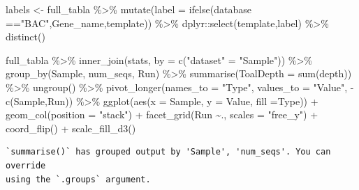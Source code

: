 \documentclass[
  letterpaper,
  DIV=11,
  numbers=noendperiod]{scrartcl}
\newenvironment{Shaded}{\begin{snugshade}}{\end{snugshade}}
\newcommand{\AttributeTok}[1]{\textcolor[rgb]{0.40,0.45,0.13}{#1}}
\newcommand{\FunctionTok}[1]{\textcolor[rgb]{0.28,0.35,0.67}{#1}}
\newcommand{\NormalTok}[1]{\textcolor[rgb]{0.00,0.23,0.31}{#1}}
\newcommand{\OtherTok}[1]{\textcolor[rgb]{0.00,0.23,0.31}{#1}}
\newcommand{\SpecialCharTok}[1]{\textcolor[rgb]{0.37,0.37,0.37}{#1}}
\newcommand{\StringTok}[1]{\textcolor[rgb]{0.13,0.47,0.30}{#1}}
\begin{document}
\begin{Shaded}
\begin{Highlighting}[]
\NormalTok{labels }\OtherTok{\textless{}{-}}\NormalTok{ full\_tabla }\SpecialCharTok{\%\textgreater{}\%} \FunctionTok{mutate}\NormalTok{(}\AttributeTok{label =} \FunctionTok{ifelse}\NormalTok{(database }\SpecialCharTok{==}\StringTok{"BAC"}\NormalTok{,Gene\_name,template)) }\SpecialCharTok{\%\textgreater{}\%}\NormalTok{ dplyr}\SpecialCharTok{::}\FunctionTok{select}\NormalTok{(template,label) }\SpecialCharTok{\%\textgreater{}\%} \FunctionTok{distinct}\NormalTok{()}



\NormalTok{full\_tabla }\SpecialCharTok{\%\textgreater{}\%} \FunctionTok{inner\_join}\NormalTok{(stats, }\AttributeTok{by =} \FunctionTok{c}\NormalTok{(}\StringTok{"dataset"} \OtherTok{=} \StringTok{"Sample"}\NormalTok{)) }\SpecialCharTok{\%\textgreater{}\%} 
  \FunctionTok{group\_by}\NormalTok{(Sample, num\_seqs, Run) }\SpecialCharTok{\%\textgreater{}\%} 
  \FunctionTok{summarise}\NormalTok{(}\AttributeTok{ToalDepth =} \FunctionTok{sum}\NormalTok{(depth)) }\SpecialCharTok{\%\textgreater{}\%} 
  \FunctionTok{ungroup}\NormalTok{() }\SpecialCharTok{\%\textgreater{}\%} 
  \FunctionTok{pivot\_longer}\NormalTok{(}\AttributeTok{names\_to =} \StringTok{"Type"}\NormalTok{, }\AttributeTok{values\_to =} \StringTok{"Value"}\NormalTok{, }\SpecialCharTok{{-}}\FunctionTok{c}\NormalTok{(Sample,Run)) }\SpecialCharTok{\%\textgreater{}\%} 
  \FunctionTok{ggplot}\NormalTok{(}\FunctionTok{aes}\NormalTok{(}\AttributeTok{x =}\NormalTok{ Sample, }\AttributeTok{y =}\NormalTok{ Value, }\AttributeTok{fill =}\NormalTok{Type)) }\SpecialCharTok{+} 
  \FunctionTok{geom\_col}\NormalTok{(}\AttributeTok{position =} \StringTok{"stack"}\NormalTok{) }\SpecialCharTok{+} 
  \FunctionTok{facet\_grid}\NormalTok{(Run }\SpecialCharTok{\textasciitilde{}}\NormalTok{., }\AttributeTok{scales =} \StringTok{"free\_y"}\NormalTok{) }\SpecialCharTok{+} 
  \FunctionTok{coord\_flip}\NormalTok{() }\SpecialCharTok{+}
  \FunctionTok{scale\_fill\_d3}\NormalTok{()}
\end{Highlighting}
\end{Shaded}

\begin{verbatim}
`summarise()` has grouped output by 'Sample', 'num_seqs'. You can override
using the `.groups` argument.
\end{verbatim}
\end{document}
